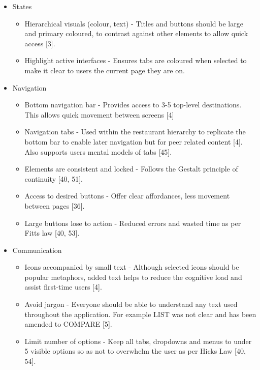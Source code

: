 \documentclass[a4 paper, 12pt]{article}
\begin{document}
\begin{itemize}
            \item States
            \begin{itemize}
                \item Hierarchical visuals (colour, text) - Titles and buttons should be large and primary coloured, to contrast against other elements to allow quick access [3].
                \item Highlight active interfaces - Ensures tabs are coloured when selected to make it clear to users the current page they are on.
            \end{itemize}

            \item Navigation
            \begin{itemize}                
                \item Bottom navigation bar - Provides access to 3-5 top-level destinations. This allows quick movement between screens [4]
                \item Navigation tabs - Used within the restaurant hierarchy to replicate the bottom bar to enable later navigation but for peer related content [4]. Also supports users mental models of tabs [45].
                \item Elements are consistent and locked - Follows the Gestalt principle of continuity [40, 51].
                \item Access to desired buttons - Offer clear affordances, less movement between pages [36].
                \item Large buttons lose to action - Reduced errors and wasted time as per Fitts law [40, 53].
            \end{itemize}
                
            \item Communication 
            \begin{itemize}
                \item Icons accompanied by small text - Although selected icons should be popular metaphors, added text helps to reduce the cognitive load and assist first-time users [4].
                \item Avoid jargon - Everyone should be able to understand any text used throughout the application. For example LIST was not clear and has been amended to COMPARE [5].
                \item Limit number of options - Keep all tabs, dropdowns and menus to under 5 visible options so as not to overwhelm the user as per Hicks Law [40, 54].
            \end{itemize}
            

\end{itemize}
\end{document}
